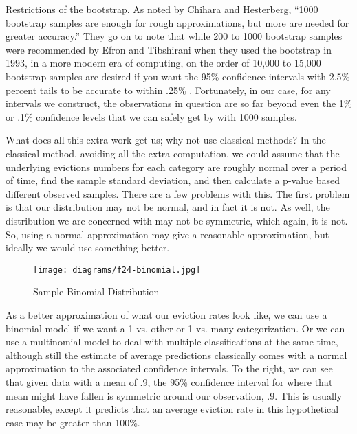 \par Restrictions of the bootstrap.  As noted by Chihara and Hesterberg, “1000 bootstrap samples are enough for rough approximations, but more are needed for greater accuracy.” \citep{BOOK:3}  They go on to note that while 200 to 1000 bootstrap samples were recommended by Efron and Tibshirani when they used the bootstrap in 1993, in a more modern era of computing, on the order of 10,000 to 15,000 bootstrap samples are desired if you want the 95\% confidence intervals with 2.5\% percent tails to be accurate to within .25\% \citep{BOOK:3}.  Fortunately, in our case, for any intervals we construct, the observations in question are so far beyond even the 1\% or .1\% confidence levels that we can safely get by with 1000 samples.

\par What does all this extra work get us; why not use classical methods?  In the classical method, avoiding all the extra computation, we could assume that the underlying evictions numbers for each category are roughly normal over a period of time, find the sample standard deviation, and then calculate a p-value based different observed samples.  There are a few problems with this.  The first problem is that our distribution may not be normal, and in fact it is not.  As well, the distribution we are concerned with may not be symmetric, which again, it is not.  So, using a normal approximation may give a reasonable approximation, but ideally we would use something better.

\begin{wrapfigure}{r}{2in}
\texttt{[image: diagrams/f24-binomial.jpg]}
\caption{Sample Binomial Distribution}
\label{fig:figure24}
\end{wrapfigure}

\par As a better approximation of what our eviction rates look like, we can use a binomial model if we want a 1 vs. other or 1 vs. many categorization.  Or we can use a multinomial model to deal with multiple classifications at the same time, although still the estimate of average predictions classically comes with a normal approximation to the associated confidence intervals.  To the right, we can see that given data with a mean of .9, the 95\% confidence interval for where that mean might have fallen is symmetric around our observation, .9.  This is usually reasonable, except it predicts that an average eviction rate in this hypothetical case may be greater than 100\%.

